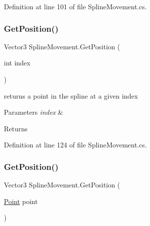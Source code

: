 Definition at line 101 of file Spline\+Movement.\+cs.

\mbox{\label{class_spline_movement_ad49c7e2dff671d59557385b4b464b2ad}} 
\subsubsection{\texorpdfstring{Get\+Position()}{GetPosition()}\hspace{0.1cm}{\footnotesize\ttfamily [1/2]}}
{\footnotesize\ttfamily Vector3 Spline\+Movement.\+Get\+Position (\begin{DoxyParamCaption}\item[{int}]{index }\end{DoxyParamCaption})}



returns a point in the spline at a given index 


\begin{DoxyParams}{Parameters}
{\em index} & \\
\hline
\end{DoxyParams}
\begin{DoxyReturn}{Returns}

\end{DoxyReturn}


Definition at line 124 of file Spline\+Movement.\+cs.

\mbox{\label{class_spline_movement_a7c6e2706a671008309d50e628c004462}} 
\subsubsection{\texorpdfstring{Get\+Position()}{GetPosition()}\hspace{0.1cm}{\footnotesize\ttfamily [2/2]}}
{\footnotesize\ttfamily Vector3 Spline\+Movement.\+Get\+Position (\begin{DoxyParamCaption}\item[{\mbox{\hyperlink{class_spline_movement_1_1_point}{Point}}}]{point }\end{DoxyParamCaption})}



